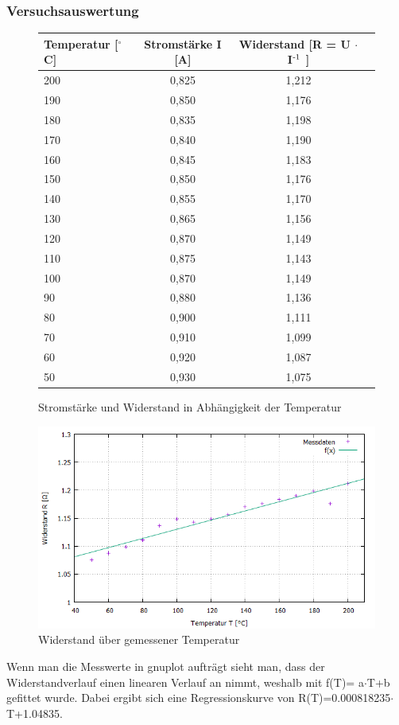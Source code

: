 \documentclass{scrartcl}
\begin{document}
\subsubsection{Versuchsauswertung}
\begin{figure}
	\centering
	\caption{Stromstärke und Widerstand in Abhängigkeit der Temperatur}
\begin{tabular}{l| c c c}
		Temperatur [$^\circ$C] & Stromstärke I [A] & Widerstand [R = U $\cdot$ I$\textsuperscript{-1}$ ] \\ \hline \hline
		200  & 0,825 & 1,212 \\
		190  & 0,850 & 1,176 \\
		180  & 0,835 & 1,198 \\
		170  & 0,840 & 1,190 \\
		160  & 0,845 & 1,183 \\
		150  & 0,850 & 1,176 \\
		140  & 0,855 & 1,170 \\
		130  & 0,865 & 1,156 \\
		120  & 0,870 & 1,149 \\
		110  & 0,875 & 1,143 \\
		100  & 0,870 & 1,149 \\
		 90  & 0,880 & 1,136 \\
		 80  & 0,900 & 1,111 \\
		 70  & 0,910 & 1,099 \\
		 60  & 0,920 & 1,087 \\
		 50  & 0,930 & 1,075 \\
\end{tabular}
\end{figure}
\begin{figure} 
  \centering
  \caption{Widerstand über gemessener Temperatur}
     \includegraphics[width=1\textwidth]{Diagramm.png}
\end{figure}
Wenn man die Messwerte in gnuplot aufträgt sieht man, dass der Widerstandverlauf einen linearen Verlauf an nimmt, weshalb mit f(T)= a$\cdot$T+b gefittet wurde. Dabei ergibt sich eine Regressionskurve von R(T)=0.000818235$\cdot$T+1.04835.
\end{document}
